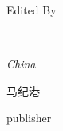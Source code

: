 \begin{titlepage}
	
	Edited By
	
	\vspace{0.5\baselineskip} %
	
	{\scshape\Large \@author \\} %
	
	\vspace{0.5\baselineskip} %
	
	\textit{China} %
	
	\vfill %
	
    \makeatletter

	
    \newcommand{\plogo}{} %

	\plogo %
	
	\vspace{0.3\baselineskip} %
	
	马纪港 %

	{\large publisher} %

\end{titlepage}


